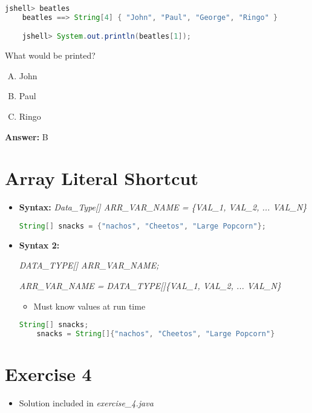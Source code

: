 \documentclass[12pt]{article}
\begin{document}
\begin{enumerate}[1.]
    \begin{lstlisting}[language=Java]
    jshell> beatles
    beatles ==> String[4] { "John", "Paul", "George", "Ringo" }

    jshell> System.out.println(beatles[1]);
    \end{lstlisting}

    What would be printed?

    \bigskip

    \begin{enumerate}[A.]
        \item John
        \item Paul
        \item Ringo
    \end{enumerate}

    \bigskip

    \textbf{Answer:} B

\end{enumerate}

\bigskip

\section{Array Literal Shortcut}

\bigskip

\begin{itemize}
    \item \textbf{Syntax:} \textit{Data\_Type[] ARR\_VAR\_NAME = \{VAL\_1, VAL\_2, ... VAL\_N\}}

    \begin{lstlisting}[language=Java]
    String[] snacks = {"nachos", "Cheetos", "Large Popcorn"};
    \end{lstlisting}

    \item \textbf{Syntax 2:}

    \textit{DATA\_TYPE[] ARR\_VAR\_NAME;}

    \textit{ARR\_VAR\_NAME  = DATA\_TYPE[]\{VAL\_1, VAL\_2, ... VAL\_N\}}

    \begin{itemize}
        \item Must know values at run time
    \end{itemize}


    \begin{lstlisting}[language=Java]
    String[] snacks;
    snacks = String[]{"nachos", "Cheetos", "Large Popcorn"}
    \end{lstlisting}
\end{itemize}

\bigskip

\section{Exercise 4}

\bigskip

\begin{itemize}
    \item Solution included in \textit{exercise\_4.java}
\end{itemize}
\end{document}

